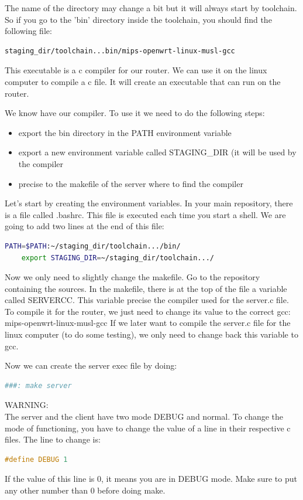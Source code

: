 The name of the directory may change a bit but it will always start by toolchain.
So if you go to the 'bin' directory inside the toolchain, you should find the following file:
\begin{lstlisting}[language=bash]
	staging_dir/toolchain...bin/mips-openwrt-linux-musl-gcc
\end{lstlisting}

This executable is a c compiler for our router. We can use it on the linux computer to compile a c file. It will create an executable that can run on the router.


We know have our compiler. To use it we need to do the following steps:
\begin{itemize}
	\item export the bin directory in the PATH environment variable
	\item export a new environment variable called STAGING\_DIR (it will be used by the compiler
	\item precise to the makefile of the server where to find the compiler
\end{itemize}

Let's start by creating the environment variables. In your main repository, there is a file called .bashrc. This file is executed each time you start a shell. We are going to add two lines at the end of this file:
\begin{lstlisting}[language=bash]
	PATH=$PATH:~/staging_dir/toolchain.../bin/
	export STAGING_DIR=~/staging_dir/toolchain.../
\end{lstlisting}

Now we only need to slightly change the makefile. Go to the repository containing the sources.
In the makefile, there is at the top of the file a variable called SERVERCC.
This variable precise the compiler used for the server.c file.
To compile it for the router, we just need to change its value to the correct gcc: mips-openwrt-linux-musl-gcc
If we later want to compile the server.c file for the linux computer (to do some testing), we only need to change back this variable to gcc.


Now we can create the server exec file by doing:

\begin{lstlisting}[language=bash]
	###: make server
\end{lstlisting}

\large WARNING:\\
The server and the client have two mode DEBUG and normal. To change the mode of functioning, you have to change the value of a line in their respective c files. The line to change is:
\begin{lstlisting}[language=c]
	#define DEBUG 1
\end{lstlisting}
If the value of this line is 0, it means you are in DEBUG mode. Make sure to put any other number than 0 before doing make.

